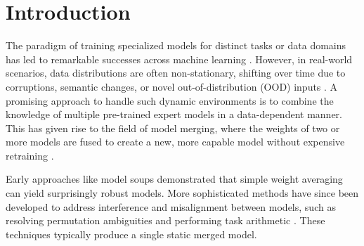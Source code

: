 \documentclass{article}
\theoremstyle{plain}
\theoremstyle{definition}
\theoremstyle{remark}
\begin{document}
\begin{abstract}
Test-time model merging (TTMM) offers a powerful paradigm for dynamically adapting to new data distributions by combining the weights of specialized expert models. However, existing TTMM methods rely on expensive, iterative online optimization for each test batch, introducing significant latency that prohibits real-world, low-latency deployment. In this work, we introduce Hyper-TTMM, a novel framework that completely eliminates this iterative optimization by amortizing the search for optimal merging coefficients. We pre-train a lightweight, feature-driven hypernetwork to directly predict near-optimal, layer-wise merging coefficients in a single, zero-shot forward pass. Our method achieves an overall accuracy of 50.41\%, which is within 0.38\% of the theoretical oracle ceiling, while being 46.6x faster than the oracle and 8.2x faster than standard gradient-based test-time adaptation (TTA). Furthermore, we identify and solve a critical failure mode of temporal smoothing under sudden domain shifts. Our proposed Adaptive EMA with Distance-Thresholded Resetting mechanism detects these shifts and resets its state, preventing catastrophic performance degradation from "moving average lag". Hyper-TTMM provides a new state-of-the-art accuracy-latency trade-off, making dynamic test-time model composition a practical reality.
\end{abstract}

\section{Introduction}
\label{sec:introduction}

The paradigm of training specialized models for distinct tasks or data domains has led to remarkable successes across machine learning \citep{krizhevsky2012imagenet, he2016deep, dosovitskiy2020image, vaswani2017attention}. However, in real-world scenarios, data distributions are often non-stationary, shifting over time due to corruptions, semantic changes, or novel out-of-distribution (OOD) inputs \citep{hendrycks2019benchmarking, schneider2020improving}. A promising approach to handle such dynamic environments is to combine the knowledge of multiple pre-trained expert models in a data-dependent manner. This has given rise to the field of model merging, where the weights of two or more models are fused to create a new, more capable model without expensive retraining \citep{jin2024modelmerging}.

Early approaches like model soups \citep{wortsman2022model} demonstrated that simple weight averaging can yield surprisingly robust models. More sophisticated methods have since been developed to address interference and misalignment between models, such as resolving permutation ambiguities \citep{entezari2022the, singh2020model} and performing task arithmetic \citep{ilharco2022editing, yadav2023ties}. These techniques typically produce a single static merged model.
\end{document}
